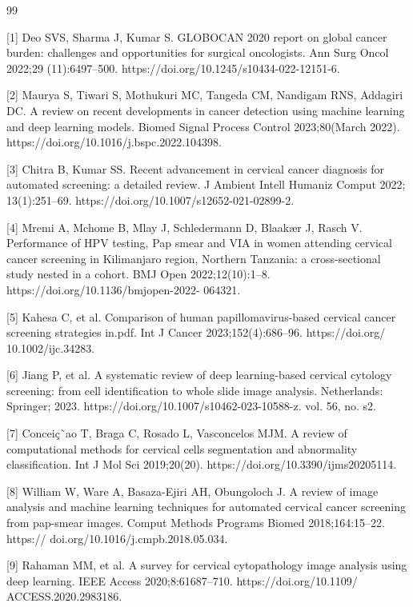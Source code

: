 \documentclass{svjour3}
\begin{document}
\begin{thebibliography}{99}

 [1] Deo SVS, Sharma J, Kumar S. GLOBOCAN 2020 report on global cancer burden: challenges and opportunities for surgical oncologists. Ann Surg Oncol 2022;29 (11):6497–500. https://doi.org/10.1245/s10434-022-12151-6.

 [2] Maurya S, Tiwari S, Mothukuri MC, Tangeda CM, Nandigam RNS, Addagiri DC. A review on recent developments in cancer detection using machine learning and deep learning models. Biomed Signal Process Control 2023;80(March 2022). https://doi.org/10.1016/j.bspc.2022.104398.

 [3] Chitra B, Kumar SS. Recent advancement in cervical cancer diagnosis for automated screening: a detailed review. J Ambient Intell Humaniz Comput 2022; 13(1):251–69. https://doi.org/10.1007/s12652-021-02899-2.

 [4] Mremi A, Mchome B, Mlay J, Schledermann D, Blaakær J, Rasch V. Performance of HPV testing, Pap smear and VIA in women attending cervical cancer screening in Kilimanjaro region, Northern Tanzania: a cross-sectional study nested in a cohort. BMJ Open 2022;12(10):1–8. https://doi.org/10.1136/bmjopen-2022- 064321.

 [5] Kahesa C, et al. Comparison of human papillomavirus-based cervical cancer screening strategies in.pdf. Int J Cancer 2023;152(4):686–96. https://doi.org/ 10.1002/ijc.34283.

 [6] Jiang P, et al. A systematic review of deep learning-based cervical cytology screening: from cell identification to whole slide image analysis. Netherlands: Springer; 2023. https://doi.org/10.1007/s10462-023-10588-z. vol. 56, no. s2.

 [7] Conceiç˜ao T, Braga C, Rosado L, Vasconcelos MJM. A review of computational methods for cervical cells segmentation and abnormality classification. Int J Mol Sci 2019;20(20). https://doi.org/10.3390/ijms20205114.

 [8] William W, Ware A, Basaza-Ejiri AH, Obungoloch J. A review of image analysis and machine learning techniques for automated cervical cancer screening from pap-smear images. Comput Methods Programs Biomed 2018;164:15–22. https:// doi.org/10.1016/j.cmpb.2018.05.034.

 [9] Rahaman MM, et al. A survey for cervical cytopathology image analysis using deep learning. IEEE Access 2020;8:61687–710. https://doi.org/10.1109/ ACCESS.2020.2983186.


\end{thebibliography}
\end{document}
